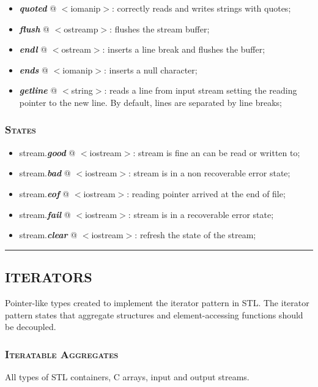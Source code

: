 \documentclass[10pt]{article}
\begin{document}
\begin{multicols*}{5}
{\begin{itemize}[leftmargin=*,topsep=0.25pt]
	\item \emph{\textbf{quoted}} @ $<$iomanip$>$: correctly reads and writes strings with quotes;
	\item \emph{\textbf{flush}} @ $<$ostreamp$>$: flushes the stream buffer;
	\item \emph{\textbf{endl}} @ $<$ostream$>$: inserts a line break and flushes the buffer;
	\item \emph{\textbf{ends}} @ $<$iomanip$>$: inserts a null character;
	\item \emph{\textbf{getline}} @ $<$string$>$: reads a line from input stream setting the reading pointer to the new line. By default, lines are separated by line breaks;
\end{itemize}

\subsubsection*{\textsc{States}} 
\begin{itemize}[leftmargin=*,topsep=0.25pt]
  \setlength\itemsep{-1.8pt}
	\item stream.\emph{\textbf{good}} @ $<$iostream$>$: stream is fine an can be read or written to;
	\item stream.\emph{\textbf{bad}} @ $<$iostream$>$: stream is in a non recoverable error state;
	\item stream.\emph{\textbf{eof}} @ $<$iostream$>$: reading pointer arrived at the end of file;
	\item stream.\emph{\textbf{fail}} @ $<$iostream$>$: stream is in a recoverable error state;
	\item stream.\emph{\textbf{clear}} @ $<$iostream$>$: refresh the state of the stream;
\end{itemize}


}

\par\noindent\rule{155pt}{0.4pt}

{\color{Blue}
\subsection*{ITERATORS}	
\noindent
Pointer-like types created to implement the iterator pattern in STL. The iterator pattern states that aggregate structures and element-accessing functions should be decoupled.

\subsubsection*{\textsc{Iteratable Aggregates}} 
\noindent
All types of STL containers, C arrays, input and output streams.

}
\end{multicols*}
\end{document}

